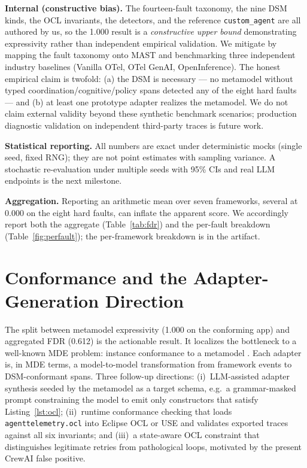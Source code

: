 \documentclass[sigconf,nonacm]{acmart}
\begin{document}
\textbf{Internal (constructive bias).} The fourteen-fault taxonomy, the nine DSM kinds, the OCL invariants, the detectors, and the reference \texttt{custom\_agent} are all authored by us, so the 1.000 result is a \emph{constructive upper bound} demonstrating expressivity rather than independent empirical validation. We mitigate by mapping the fault taxonomy onto MAST and benchmarking three independent industry baselines (Vanilla OTel, OTel GenAI, OpenInference). The honest empirical claim is twofold: (a) the DSM is necessary --- no metamodel without typed coordination/cognitive/policy spans detected any of the eight hard faults --- and (b) at least one prototype adapter realizes the metamodel. We do not claim external validity beyond these synthetic benchmark scenarios; production diagnostic validation on independent third-party traces is future work.

\textbf{Statistical reporting.} All numbers are exact under deterministic mocks (single seed, fixed RNG); they are not point estimates with sampling variance. A stochastic re-evaluation under multiple seeds with 95\% CIs and real LLM endpoints is the next milestone.

\textbf{Aggregation.} Reporting an arithmetic mean over seven frameworks, several at 0.000 on the eight hard faults, can inflate the apparent score. We accordingly report both the aggregate (Table~\ref{tab:fdr}) and the per-fault breakdown (Table~\ref{fig:perfault}); the per-framework breakdown is in the artifact.

\section{Conformance and the Adapter-Generation Direction}
\label{sec:conformance}

The split between metamodel expressivity (1.000 on the conforming app) and aggregated FDR (0.612) is the actionable result. It localizes the bottleneck to a well-known MDE problem: instance conformance to a metamodel \cite{atkinson2003mdd}. Each adapter is, in MDE terms, a model-to-model transformation from framework events to DSM-conformant spans. Three follow-up directions: (i)~LLM-assisted adapter synthesis seeded by the metamodel as a target schema, e.g.\ a grammar-masked prompt \cite{netz2024grammarmask} constraining the model to emit only constructors that satisfy Listing~\ref{lst:ocl}; (ii)~runtime conformance checking that loads \texttt{agenttelemetry.ocl} into Eclipse OCL or USE and validates exported traces against all six invariants; and (iii)~a state-aware OCL constraint that distinguishes legitimate retries from pathological loops, motivated by the present CrewAI false positive.
\end{document}
